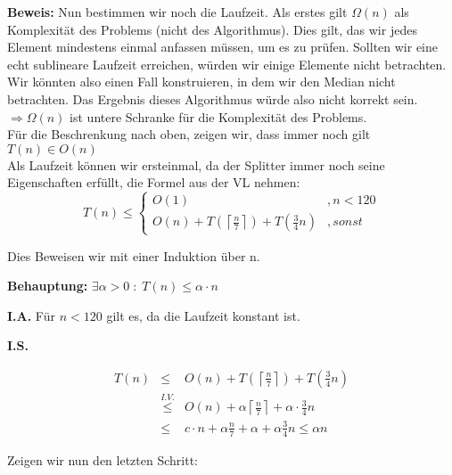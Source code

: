 \documentclass[11pt,a4paper,ngerman]{article}
\begin{document}
\begin{enumerate}[\bfseries (a)]
\textbf{Beweis:} Nun bestimmen wir noch die Laufzeit.
Als erstes gilt $\Omega (n)$ als Komplexität des Problems (nicht des Algorithmus). Dies gilt, das wir jedes Element mindestens einmal anfassen müssen, um es zu prüfen. Sollten wir eine echt sublineare Laufzeit erreichen, würden wir einige Elemente nicht betrachten. Wir könnten also einen Fall konstruieren, in dem wir den Median nicht betrachten. Das Ergebnis dieses Algorithmus würde also nicht korrekt sein. $\Rightarrow \Omega (n)$ ist untere Schranke für die Komplexität des Problems.\\
Für die Beschrenkung nach oben, zeigen wir, dass immer noch gilt $T(n) \in O(n)$\\
Als Laufzeit können wir ersteinmal, da der Splitter immer noch seine Eigenschaften erfüllt, die Formel aus der VL nehmen:\\

$$
T(n) \leq \left\{
\begin{array}{lr}
O(1) & ,n < 120 \\
O(n) + T\left( \left \lceil \frac{n}{7} \right \rceil \right) + T \left( \frac{3}{4} n \right) & , sonst
\end{array}
\right.
$$

Dies Beweisen wir mit einer Induktion über n.

\begin{description}

\item{\bfseries Behauptung:} $\exists \alpha > 0 \; : \;T(n) \leq \alpha \cdot n$

\item{\bfseries I.A.} Für $n< 120$  gilt es, da die Laufzeit konstant ist.

\item{\bfseries I.S.}

$$
\begin{array}{rcl}
T(n) &\leq& O(n) + T\left( \left \lceil \frac{n}{7} \right \rceil \right) + T \left( \frac{3}{4} n \right)\\
&\stackrel{I.V.}{\leq}& O(n) + \alpha \left \lceil \frac{n}{7} \right \rceil + \alpha \cdot \frac{3}{4} n\\
&\leq& c \cdot n + \alpha \frac{n}{7} + \alpha + \alpha \frac{3}{4} n \leq \alpha n
\end{array}
$$

Zeigen wir nun den letzten Schritt:


\end{description}
\end{enumerate}
\end{document}
